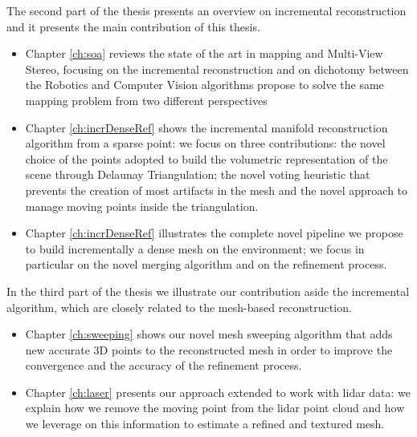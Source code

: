 The second part of the thesis presents an overview on incremental reconstruction and it presents the main contribution of this thesis.
\begin{itemize}
 \item Chapter \ref{ch:soa} reviews the state of the art in mapping and Multi-View Stereo, focusing on the incremental reconstruction and on dichotomy between the Robotics and  Computer Vision algorithms propose to solve the same mapping problem from two different perspectives
 \item Chapter \ref{ch:incrDenseRef} shows the incremental manifold reconstruction algorithm from a sparse point:  we focus on three contributions: the novel choice of the points adopted to build the volumetric representation of the scene through Delaunay Triangulation; the novel voting heuristic that prevents the creation of most artifacts in the mesh and the novel approach to manage moving points inside the triangulation.
 \item Chapter \ref{ch:incrDenseRef} illustrates the complete novel pipeline we propose to build incrementally a dense mesh on the environment; we focus in particular on the novel merging algorithm and on the refinement process.
\end{itemize}

In the third part of the thesis we illustrate our contribution aside the incremental algorithm, which are closely related to the mesh-based reconstruction.

\begin{itemize}
 \item Chapter \ref{ch:sweeping} shows our novel mesh sweeping algorithm that adds new accurate 3D points to the reconstructed mesh in order to  improve the convergence and the accuracy of the refinement process.
 \item Chapter \ref{ch:laser} presents our approach extended to work with lidar data: we explain how we remove the moving point from the lidar point cloud and how we leverage on this information to estimate a refined and textured mesh.
\end{itemize}















